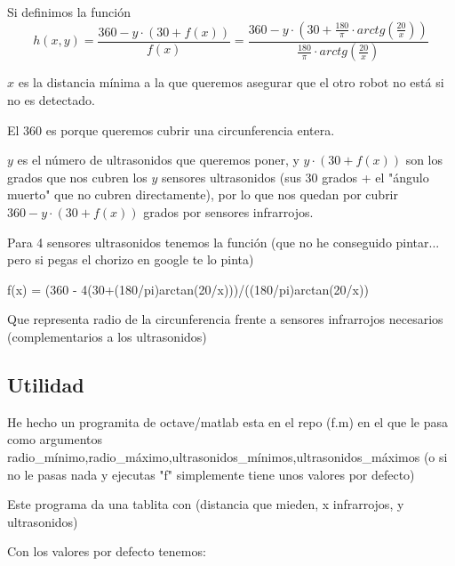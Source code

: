 \documentclass[a4paper,10pt]{article}
\newcommand{\rtg}{\frac{180}{\pi}}
\begin{document}
Si definimos la función \[h(x,y)= \frac{360 - y\cdot(30 + f(x))}{f(x)} = \frac{360 - y\cdot(30 + \displaystyle \rtg \cdot arctg\left(\frac{20}{x}\right))}{\displaystyle \rtg \cdot arctg\left(\frac{20}{x}\right)} \]

$x$ es la distancia mínima a la que queremos asegurar que el otro robot no está si no es detectado.

El $360$ es porque queremos cubrir una circunferencia entera. 

$y$ es el número de ultrasonidos que queremos poner, y $y\cdot(30 + f(x))$ son los grados que nos cubren los $y$ sensores ultrasonidos (sus 30 grados + el "ángulo muerto" que no cubren directamente), por lo que nos quedan por cubrir $360 - y\cdot(30 + f(x))$ grados por sensores infrarrojos.

Para 4 sensores ultrasonidos tenemos la función (que no he conseguido pintar... pero si pegas el chorizo en google te lo pinta)

f(x) = (360 - 4(30+(180/pi)arctan(20/x)))/((180/pi)arctan(20/x))

Que representa radio de la circunferencia frente a sensores infrarrojos necesarios (complementarios a los ultrasonidos)
 

\subsection{Utilidad}

He hecho un programita de octave/matlab esta en el repo (f.m) en el que le pasa como argumentos radio\_mínimo,radio\_máximo,ultrasonidos\_mínimos,ultrasonidos\_máximos (o si no le pasas nada y ejecutas "f" simplemente tiene unos valores por defecto)

Este programa da una tablita con (distancia que mieden, x infrarrojos, y ultrasonidos)

Con los valores por defecto tenemos:
\end{document}
